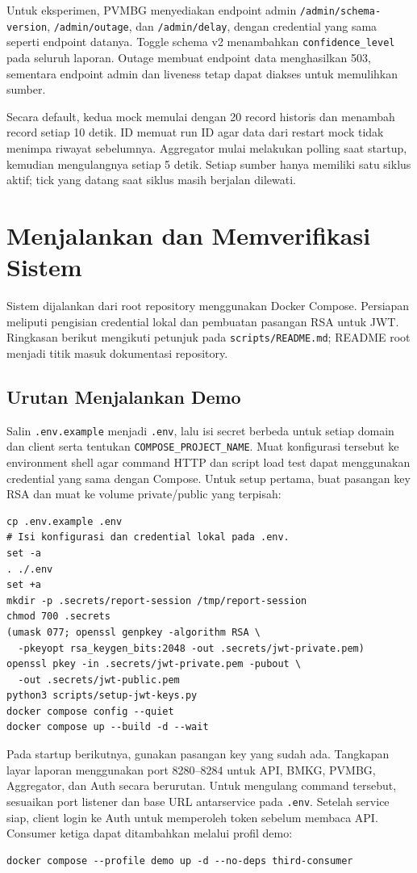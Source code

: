 Untuk eksperimen, PVMBG menyediakan endpoint admin \texttt{/admin/schema-version}, \texttt{/admin/outage}, dan \texttt{/admin/delay}, dengan credential yang sama seperti endpoint datanya. Toggle schema v2 menambahkan \texttt{confidence\_level} pada seluruh laporan. Outage membuat endpoint data menghasilkan 503, sementara endpoint admin dan liveness tetap dapat diakses untuk memulihkan sumber.

Secara default, kedua mock memulai dengan 20 record historis dan menambah record setiap 10 detik. ID memuat run ID agar data dari restart mock tidak menimpa riwayat sebelumnya. Aggregator mulai melakukan polling saat startup, kemudian mengulangnya setiap 5 detik. Setiap sumber hanya memiliki satu siklus aktif; tick yang datang saat siklus masih berjalan dilewati.

\section{Menjalankan dan Memverifikasi Sistem}
Sistem dijalankan dari root repository menggunakan Docker Compose. Persiapan meliputi pengisian credential lokal dan pembuatan pasangan RSA untuk JWT. Ringkasan berikut mengikuti petunjuk pada \texttt{scripts/README.md}; README root menjadi titik masuk dokumentasi repository.

\subsection{Urutan Menjalankan Demo}
Salin \texttt{.env.example} menjadi \texttt{.env}, lalu isi secret berbeda untuk setiap domain dan client serta tentukan \texttt{COMPOSE\_PROJECT\_NAME}. Muat konfigurasi tersebut ke environment shell agar command HTTP dan script load test dapat menggunakan credential yang sama dengan Compose. Untuk setup pertama, buat pasangan key RSA dan muat ke volume private/public yang terpisah:
\begin{lstlisting}
cp .env.example .env
# Isi konfigurasi dan credential lokal pada .env.
set -a
. ./.env
set +a
mkdir -p .secrets/report-session /tmp/report-session
chmod 700 .secrets
(umask 077; openssl genpkey -algorithm RSA \
  -pkeyopt rsa_keygen_bits:2048 -out .secrets/jwt-private.pem)
openssl pkey -in .secrets/jwt-private.pem -pubout \
  -out .secrets/jwt-public.pem
python3 scripts/setup-jwt-keys.py
docker compose config --quiet
docker compose up --build -d --wait
\end{lstlisting}
Pada startup berikutnya, gunakan pasangan key yang sudah ada. Tangkapan layar laporan menggunakan port 8280--8284 untuk API, BMKG, PVMBG, Aggregator, dan Auth secara berurutan. Untuk mengulang command tersebut, sesuaikan port listener dan base URL antarservice pada \texttt{.env}. Setelah service siap, client login ke Auth untuk memperoleh token sebelum membaca API. Consumer ketiga dapat ditambahkan melalui profil demo:
\begin{lstlisting}
docker compose --profile demo up -d --no-deps third-consumer
\end{lstlisting}

